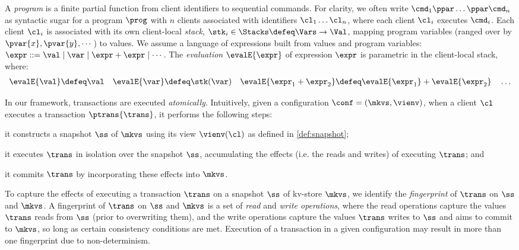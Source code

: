 A {\em program} is a finite partial function from client identifiers to sequential
commands.
For clarity, we often write \( \cmd_{1}\ppar \dots \ppar \cmd_{n}\) as syntactic sugar 
for a program \( \prog \) with $n$ clients associated with identifiers
$\cl_1 \dots \cl_n$, where each client $\cl_i$ executes
$\cmd_i$. 
Each client $\cl_i$ is associated with its own client-local  \emph{stack}, 
$\stk_i \in \Stacks \defeq \Vars \to \Val$,  mapping program variables
(ranged over by $\pvar{x}, \pvar{y}, \cdots$)
to values. 
We assume a language of expressions built from values
and program variables:
$\expr ::= \val \mid \var \mid \expr + \expr \mid \cdots$.
The \emph{evaluation} $\evalE{\expr}$ of  expression $\expr$ is parametric in
the client-local stack, where:%
%
{%
\begin{gather*}
\evalE{\val} \defeq
\val
\quad
\evalE{\var} \defeq
\stk(\var)
\quad
\evalE{\expr_{1} + \expr_{2}} \defeq
\evalE{\expr_{1}} + \evalE{\expr_{2}}
\quad
\dots
\end{gather*}%
}%

In our framework, transactions are executed \emph{atomically}. 
Intuitively, given a configuration $\conf = (\mkvs, \vienv)$, 
when a client $\cl$ executes a transaction $\ptrans{\trans}$, 
it performs the following steps: 
\begin{enumerate*}
	\item it constructs a snapshot $\ss$ of $\mkvs$ using its view $\vienv(\cl)$ as defined in \cref{def:snapshot};  
	\item it executes $\trans$ in isolation over the snapshot $\ss$, accumulating the  
effects (i.e. the reads and writes) of executing $\trans$; and
	\item it commits $\trans$ by incorporating these effects into $\mkvs$.
\end{enumerate*}


To capture the effects of executing a transaction $\trans$ on a snapshot $\ss$ of kv-store $\mkvs$, 
we identify the \emph{fingerprint} of $\trans$ on $\ss$ and $\mkvs$.
A fingerprint of $\trans$ on $\ss$ and $\mkvs$
is a set of \emph{read} and \emph{write operations}, where
the read operations capture the values $\trans$ reads from $\ss$ (prior to overwriting them), and
the write operations capture the values $\trans$ writes to $\ss$ and aims to commit to $\mkvs$, so long as certain consistency conditions are met.  
Execution of a transaction in a given configuration may result in more than one fingerprint due to non-determinism. 

